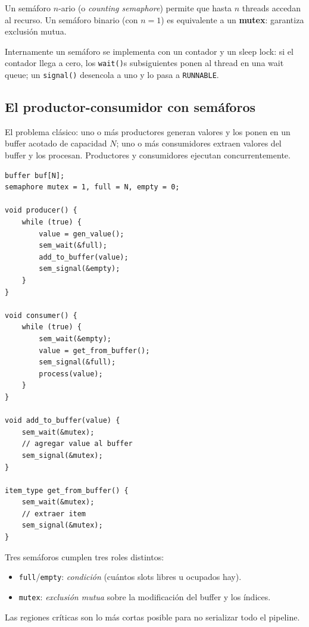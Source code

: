 \documentclass[11pt,a4paper]{article}
\begin{document}
Un semáforo $n$-ario (o \emph{counting semaphore}) permite que hasta
$n$ threads accedan al recurso. Un semáforo binario (con $n = 1$) es
equivalente a un \textbf{mutex}: garantiza exclusión mutua.

Internamente un semáforo se implementa con un contador y un sleep
lock: si el contador llega a cero, los \texttt{wait()}s subsiguientes
ponen al thread en una wait queue; un \texttt{signal()} desencola a
uno y lo pasa a \texttt{RUNNABLE}.

\subsection{El productor-consumidor con semáforos}

El problema clásico: uno o más productores generan valores y los
ponen en un buffer acotado de capacidad $N$; uno o más consumidores
extraen valores del buffer y los procesan. Productores y consumidores
ejecutan concurrentemente.

\begin{lstlisting}[style=cstyle]
buffer buf[N];
semaphore mutex = 1, full = N, empty = 0;

void producer() {
    while (true) {
        value = gen_value();
        sem_wait(&full);
        add_to_buffer(value);
        sem_signal(&empty);
    }
}

void consumer() {
    while (true) {
        sem_wait(&empty);
        value = get_from_buffer();
        sem_signal(&full);
        process(value);
    }
}

void add_to_buffer(value) {
    sem_wait(&mutex);
    // agregar value al buffer
    sem_signal(&mutex);
}

item_type get_from_buffer() {
    sem_wait(&mutex);
    // extraer item
    sem_signal(&mutex);
}
\end{lstlisting}

\begin{idea}
Tres semáforos cumplen tres roles distintos:
\begin{itemize}[leftmargin=*,nosep]
    \item \texttt{full}/\texttt{empty}: \emph{condición} (cuántos
        slots libres u ocupados hay).
    \item \texttt{mutex}: \emph{exclusión mutua} sobre la
        modificación del buffer y los índices.
\end{itemize}
Las regiones críticas son lo más cortas posible para no serializar
todo el pipeline.
\end{idea}
\end{document}
